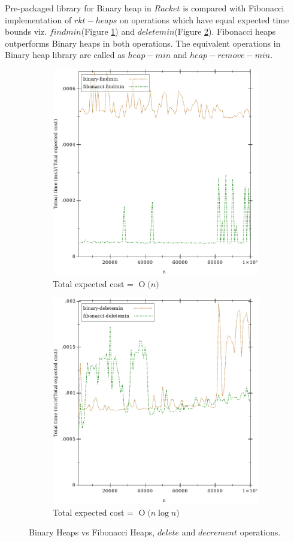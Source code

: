 \documentclass{llncs}
\newcommand{\BigO}[1]{\ensuremath{\operatorname{O}\bigl(#1\bigr)}}
\begin{document}
Pre-packaged library for Binary heap in $Racket$ is compared with Fibonacci implementation of $rkt-heaps$ on operations which have equal expected time bounds viz. $findmin$(Figure \ref{fig:findmin}) and $deletemin$(Figure \ref{fig:deletemin}). Fibonacci heaps outperforms Binary heaps in both operations. The equivalent operations in Binary heap library are called as $heap-min$ and $heap-remove-min$.

\begin{figure}
	\begin{subfigure}{0.5\textwidth}
		\centering
		\includegraphics[width=0.8\linewidth]{FIG/findmin.pdf}
		\caption{Total expected cost = \BigO{n}}
		\label{fig:findmin}
	\end{subfigure}%
	\begin{subfigure}{0.5\textwidth}
		\centering
		\includegraphics[width=0.8\linewidth]{FIG/deletemin.pdf}
		\caption{Total expected cost = \BigO{n \log n}}
		\label{fig:deletemin}
	\end{subfigure}
	\caption{Binary Heaps vs Fibonacci Heaps, $delete$ and $decrement$ operations.}
	\label{fig:fi_bi_comp}
\end{figure}
\end{document}
